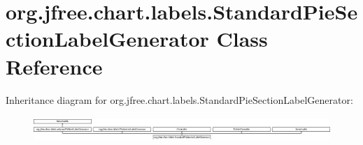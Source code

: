 \hypertarget{classorg_1_1jfree_1_1chart_1_1labels_1_1_standard_pie_section_label_generator}{}\section{org.\+jfree.\+chart.\+labels.\+Standard\+Pie\+Section\+Label\+Generator Class Reference}
\label{classorg_1_1jfree_1_1chart_1_1labels_1_1_standard_pie_section_label_generator}
Inheritance diagram for org.\+jfree.\+chart.\+labels.\+Standard\+Pie\+Section\+Label\+Generator\+:\begin{figure}[H]
\begin{center}
\leavevmode
\includegraphics[height=0.982456cm]{classorg_1_1jfree_1_1chart_1_1labels_1_1_standard_pie_section_label_generator}
\end{center}
\end{figure}

